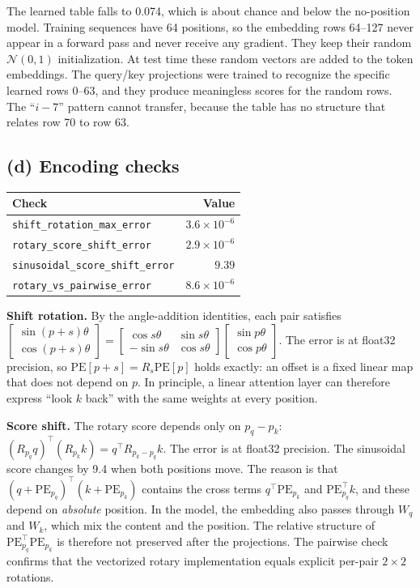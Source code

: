 \documentclass[11pt]{article}
\begin{document}
The learned table falls to 0.074, which is about chance and below the
no-position model. Training sequences have 64 positions, so the embedding
rows 64--127 never appear in a forward pass and never receive any gradient.
They keep their random $\mathcal N(0,1)$ initialization. At test time these
random vectors are added to the token embeddings. The query/key projections were
trained to recognize the specific learned rows 0--63, and they produce
meaningless scores for the random rows. The ``$i-7$'' pattern cannot transfer,
because the table has no structure that relates row 70 to row 63.

\subsection*{(d) Encoding checks}

\begin{table}[H]\centering
\begin{tabular}{lr}\toprule
Check & Value\\\midrule
\texttt{shift\_rotation\_max\_error} & $3.6\times10^{-6}$\\
\texttt{rotary\_score\_shift\_error} & $2.9\times10^{-6}$\\
\texttt{sinusoidal\_score\_shift\_error} & $9.39$\\
\texttt{rotary\_vs\_pairwise\_error} & $8.6\times10^{-6}$\\\bottomrule
\end{tabular}\end{table}

\textbf{Shift rotation.} By the angle-addition identities, each pair satisfies
$\begin{bmatrix}\sin(p+s)\theta\\\cos(p+s)\theta\end{bmatrix}=
\begin{bmatrix}\cos s\theta & \sin s\theta\\-\sin s\theta & \cos s\theta\end{bmatrix}
\begin{bmatrix}\sin p\theta\\\cos p\theta\end{bmatrix}$.
The error is at float32 precision, so $\mathrm{PE}[p+s]=R_s\mathrm{PE}[p]$ holds exactly:
an offset is a fixed linear map that does not depend on $p$. In principle, a linear
attention layer can therefore express ``look $k$ back'' with the same weights at
every position.

\textbf{Score shift.} The rotary score depends only on $p_q-p_k$:
$(R_{p_q}q)^\top(R_{p_k}k)=q^\top R_{p_k-p_q}k$. The error is at float32 precision.
The sinusoidal score changes by 9.4 when both positions move. The reason is that
$(q+\mathrm{PE}_{p_q})^\top(k+\mathrm{PE}_{p_k})$ contains the cross terms
$q^\top\mathrm{PE}_{p_k}$ and $\mathrm{PE}_{p_q}^\top k$, and these depend on
\emph{absolute} position. In the model, the embedding also passes through $W_q$ and $W_k$, which
mix the content and the position. The relative structure of
$\mathrm{PE}_{p_q}^\top\mathrm{PE}_{p_k}$ is therefore not preserved after the projections. The pairwise check
confirms that the vectorized rotary implementation equals explicit per-pair $2\times2$ rotations.
\end{document}
